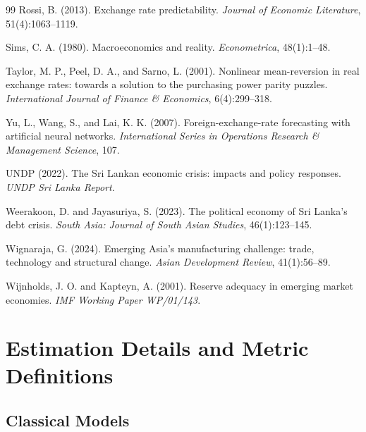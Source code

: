 \documentclass[12pt,a4paper]{article}
\begin{document}
\begin{thebibliography}{99}
Rossi, B. (2013).
\newblock Exchange rate predictability.
\newblock \textit{Journal of Economic Literature}, 51(4):1063--1119.

Sims, C. A. (1980).
\newblock Macroeconomics and reality.
\newblock \textit{Econometrica}, 48(1):1--48.

Taylor, M. P., Peel, D. A., and Sarno, L. (2001).
\newblock Nonlinear mean-reversion in real exchange rates: towards a solution to the purchasing power parity puzzles.
\newblock \textit{International Journal of Finance \& Economics}, 6(4):299--318.

Yu, L., Wang, S., and Lai, K. K. (2007).
\newblock Foreign-exchange-rate forecasting with artificial neural networks.
\newblock \textit{International Series in Operations Research \& Management Science}, 107.

UNDP (2022).
\newblock The Sri Lankan economic crisis: impacts and policy responses.
\newblock \textit{UNDP Sri Lanka Report}.

Weerakoon, D. and Jayasuriya, S. (2023).
\newblock The political economy of Sri Lanka's debt crisis.
\newblock \textit{South Asia: Journal of South Asian Studies}, 46(1):123--145.

Wignaraja, G. (2024).
\newblock Emerging Asia's manufacturing challenge: trade, technology and structural change.
\newblock \textit{Asian Development Review}, 41(1):56--89.

Wijnholds, J. O. and Kapteyn, A. (2001).
\newblock Reserve adequacy in emerging market economies.
\newblock \textit{IMF Working Paper WP/01/143}.

\end{thebibliography}

\appendix

\section{Estimation Details and Metric Definitions}

\subsection{Classical Models}
\end{document}
